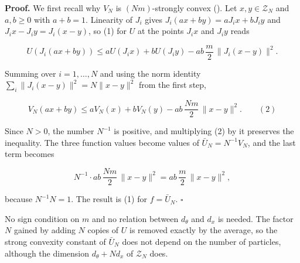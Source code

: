 \documentclass[11pt,a4paper]{article}
\begin{document}
\textbf{Proof.} We first recall why \(V_N\) is \((Nm)\)-strongly convex (\cite[Section~3.1.3]{LangevinLean2026IPLA}). Let \(x,y\in\mathcal Z_N\) and \(a,b\ge0\) with \(a+b=1\). Linearity of \(J_i\) gives \(J_i(ax+by)=aJ_ix+bJ_iy\) and \(J_ix-J_iy=J_i(x-y)\), so (1) for \(U\) at the points \(J_ix\) and \(J_iy\) reads


\[U(J_i(ax+by))\le aU(J_ix)+bU(J_iy)-ab\,\frac m2\,\|J_i(x-y)\|^2.\]


Summing over \(i=1,\dots,N\) and using the norm identity \(\sum_i\|J_i(x-y)\|^2=N\|x-y\|^2\) from the first step,


\[V_N(ax+by)\le aV_N(x)+bV_N(y)-ab\,\frac{Nm}2\,\|x-y\|^2.\qquad(2)\]


Since \(N>0\), the number \(N^{-1}\) is positive, and multiplying (2) by it preserves the inequality. The three function values become values of \(\bar U_N=N^{-1}V_N\), and the last term becomes


\[N^{-1}\cdot ab\,\frac{Nm}2\,\|x-y\|^2=ab\,\frac m2\,\|x-y\|^2,\]


because \(N^{-1}N=1\). The result is (1) for \(f=\bar U_N\). \(\square\)




No sign condition on \(m\) and no relation between \(d_\theta\) and \(d_x\) is needed. The factor \(N\) gained by adding \(N\) copies of \(U\) is removed exactly by the average, so the strong convexity constant of \(\bar U_N\) does not depend on the number of particles, although the dimension \(d_\theta+Nd_x\) of \(\mathcal Z_N\) does.
\end{document}
